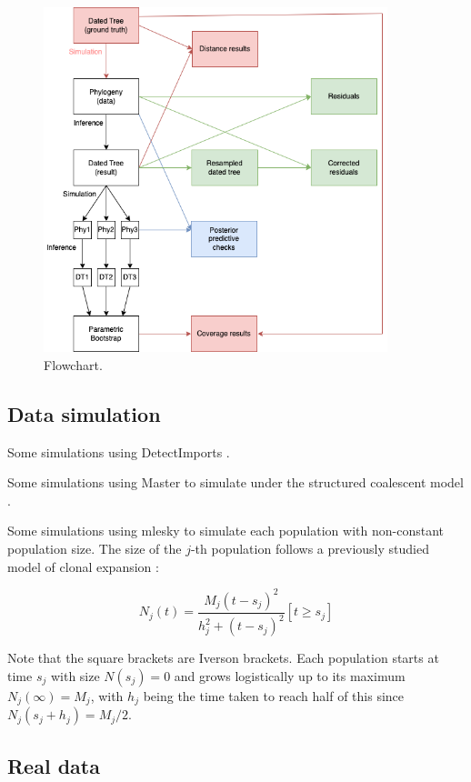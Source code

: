 \documentclass{article}
\begin{document}
\begin{figure}[p!]
\begin{center}
\includegraphics[width=10cm]{flowchart.png}
\end{center}
\caption{Flowchart.
\label{fig:flowchart}}
\end{figure}

\subsection*{Data simulation}

Some simulations using DetectImports \citep{Didelot2022detectimports}.

Some simulations using Master \citep{Vaughan2013} to simulate under the structured coalescent model \citep{Nordborg1997}.

Some simulations using mlesky \citep{Didelot2023mlesky} to simulate each population with non-constant population size. The size of the $j$-th population follows a previously studied model of clonal expansion \citep{Helekal2021}:

\begin{equation}
N_j(t)=\frac{M_j(t-s_j)^2}{h_j^2+(t-s_j)^2}[t \geq s_j]
\end{equation}

Note that the square brackets are Iverson brackets. Each population starts at time $s_j$ with size $N(s_j)=0$ and grows logistically up to its maximum $N_j(\infty)=M_j$, with $h_j$ being the time taken to reach half of this since $N_j(s_j+h_j)=M_j/2$. 


\subsection*{Real data}
\end{document}
